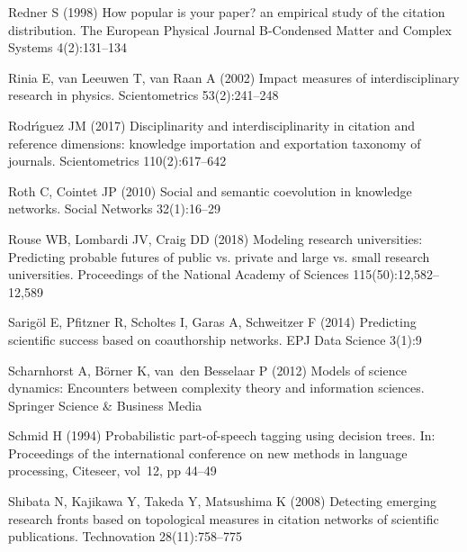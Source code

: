 \documentclass[10pt]{article}
\begin{document}
\begin{thebibliography}{84}
Redner S (1998) How popular is your paper? an empirical study of the citation
  distribution. The European Physical Journal B-Condensed Matter and Complex
  Systems 4(2):131--134

Rinia E, van Leeuwen T, van Raan A (2002) Impact measures of interdisciplinary
  research in physics. Scientometrics 53(2):241--248

Rodr{\'\i}guez JM (2017) Disciplinarity and interdisciplinarity in citation and
  reference dimensions: knowledge importation and exportation taxonomy of
  journals. Scientometrics 110(2):617--642

Roth C, Cointet JP (2010) Social and semantic coevolution in knowledge
  networks. Social Networks 32(1):16--29

Rouse WB, Lombardi JV, Craig DD (2018) Modeling research universities:
  Predicting probable futures of public vs. private and large vs. small
  research universities. Proceedings of the National Academy of Sciences
  115(50):12,582--12,589

Sarig{\"o}l E, Pfitzner R, Scholtes I, Garas A, Schweitzer F (2014) Predicting
  scientific success based on coauthorship networks. EPJ Data Science 3(1):9

Scharnhorst A, B{\"o}rner K, van~den Besselaar P (2012) Models of science
  dynamics: Encounters between complexity theory and information sciences.
  Springer Science \& Business Media

Schmid H (1994) Probabilistic part-of-speech tagging using decision trees. In:
  Proceedings of the international conference on new methods in language
  processing, Citeseer, vol~12, pp 44--49

Shibata N, Kajikawa Y, Takeda Y, Matsushima K (2008) Detecting emerging
  research fronts based on topological measures in citation networks of
  scientific publications. Technovation 28(11):758--775


\end{thebibliography}
\end{document}
